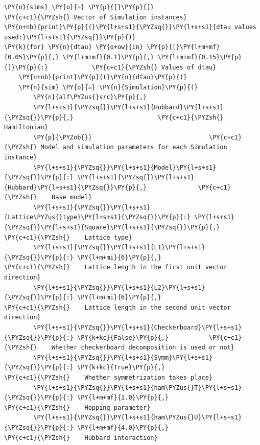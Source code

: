     \begin{tcolorbox}[breakable, size=fbox, boxrule=1pt, pad at break*=1mm,colback=cellbackground, colframe=cellborder]
\begin{Verbatim}[commandchars=\\\{\}]
\PY{n}{sims} \PY{o}{=} \PY{p}{[}\PY{p}{]}                                \PY{c+c1}{\PYZsh{} Vector of Simulation instances}
\PY{n+nb}{print}\PY{p}{(}\PY{l+s+s1}{\PYZsq{}}\PY{l+s+s1}{dtau values used:}\PY{l+s+s1}{\PYZsq{}}\PY{p}{)}
\PY{k}{for} \PY{n}{dtau} \PY{o+ow}{in} \PY{p}{[}\PY{l+m+mf}{0.05}\PY{p}{,} \PY{l+m+mf}{0.1}\PY{p}{,} \PY{l+m+mf}{0.15}\PY{p}{]}\PY{p}{:}            \PY{c+c1}{\PYZsh{} Values of dtau}
    \PY{n+nb}{print}\PY{p}{(}\PY{n}{dtau}\PY{p}{)}
    \PY{n}{sim} \PY{o}{=} \PY{n}{Simulation}\PY{p}{(}
        \PY{n}{alf\PYZus{}src}\PY{p}{,}
        \PY{l+s+s1}{\PYZsq{}}\PY{l+s+s1}{Hubbard}\PY{l+s+s1}{\PYZsq{}}\PY{p}{,}                       \PY{c+c1}{\PYZsh{} Hamiltonian}
        \PY{p}{\PYZob{}}                                \PY{c+c1}{\PYZsh{} Model and simulation parameters for each Simulation instance}
        \PY{l+s+s1}{\PYZsq{}}\PY{l+s+s1}{Model}\PY{l+s+s1}{\PYZsq{}}\PY{p}{:} \PY{l+s+s1}{\PYZsq{}}\PY{l+s+s1}{Hubbard}\PY{l+s+s1}{\PYZsq{}}\PY{p}{,}              \PY{c+c1}{\PYZsh{}    Base model}
        \PY{l+s+s1}{\PYZsq{}}\PY{l+s+s1}{Lattice\PYZus{}type}\PY{l+s+s1}{\PYZsq{}}\PY{p}{:} \PY{l+s+s1}{\PYZsq{}}\PY{l+s+s1}{Square}\PY{l+s+s1}{\PYZsq{}}\PY{p}{,}        \PY{c+c1}{\PYZsh{}    Lattice type}
        \PY{l+s+s1}{\PYZsq{}}\PY{l+s+s1}{L1}\PY{l+s+s1}{\PYZsq{}}\PY{p}{:} \PY{l+m+mi}{6}\PY{p}{,}                         \PY{c+c1}{\PYZsh{}    Lattice length in the first unit vector direction}
        \PY{l+s+s1}{\PYZsq{}}\PY{l+s+s1}{L2}\PY{l+s+s1}{\PYZsq{}}\PY{p}{:} \PY{l+m+mi}{6}\PY{p}{,}                         \PY{c+c1}{\PYZsh{}    Lattice length in the second unit vector direction}
        \PY{l+s+s1}{\PYZsq{}}\PY{l+s+s1}{Checkerboard}\PY{l+s+s1}{\PYZsq{}}\PY{p}{:} \PY{k+kc}{False}\PY{p}{,}           \PY{c+c1}{\PYZsh{}    Whether checkerboard decomposition is used or not}
        \PY{l+s+s1}{\PYZsq{}}\PY{l+s+s1}{Symm}\PY{l+s+s1}{\PYZsq{}}\PY{p}{:} \PY{k+kc}{True}\PY{p}{,}                    \PY{c+c1}{\PYZsh{}    Whether symmetrization takes place}
        \PY{l+s+s1}{\PYZsq{}}\PY{l+s+s1}{ham\PYZus{}T}\PY{l+s+s1}{\PYZsq{}}\PY{p}{:} \PY{l+m+mf}{1.0}\PY{p}{,}                    \PY{c+c1}{\PYZsh{}    Hopping parameter}
        \PY{l+s+s1}{\PYZsq{}}\PY{l+s+s1}{ham\PYZus{}U}\PY{l+s+s1}{\PYZsq{}}\PY{p}{:} \PY{l+m+mf}{4.0}\PY{p}{,}                    \PY{c+c1}{\PYZsh{}    Hubbard interaction}

\end{Verbatim}
\end{tcolorbox}
